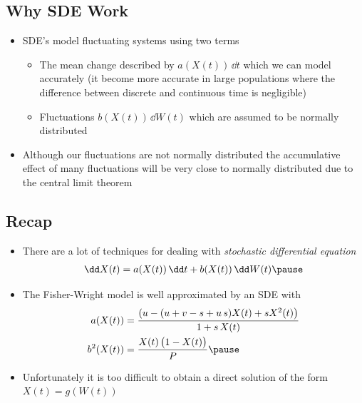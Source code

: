 
\begin{slide}
\section{Why SDE Work}

\begin{PauseHighLight}
  \begin{itemize}
  \item SDE's model fluctuating systems using two terms
    \begin{itemize}
    \item The mean change described by $a(X(t))\,\dd t$ which we can model
      accurately (it become more accurate in large populations where the
      difference between discrete and continuous time is
      negligible)\pause
    \item Fluctuations $b(X(t))\, \dd W(t)$ which are assumed to be
      normally distributed\pause
    \end{itemize}
  \item Although our fluctuations are not normally distributed the
    accumulative effect of many fluctuations will be very close to
    normally distributed due to the central limit theorem\pause
  \end{itemize}
\end{PauseHighLight}

\end{slide}



\begin{slide}
\section{Recap}

\begin{PauseHighLight}
  \begin{itemize}
  \item There are a lot of techniques for dealing with 
    \textit{stochastic differential equation}
    \begin{align*}
      \dd X(t) = a(X(t))\, \dd t + b(X(t))\, \dd W(t)\pause
    \end{align*}
  \item The Fisher-Wright model is well approximated by an SDE with
    \begin{align*}
      a(X(t)) &= \frac{(u - (u+v-s+u\,s) X(t) + s X^2(t)
        \bigr)}{1+s\,X(t)} \\
      b^2(X(t)) &= \frac{X(t)\left(\strut 1-X(t)\right)}{P}\pause
    \end{align*}
  \item Unfortunately it is too difficult to obtain a direct solution of
    the form $X(t) = g(W(t))$\pause
  \end{itemize}
\end{PauseHighLight}

\end{slide}




